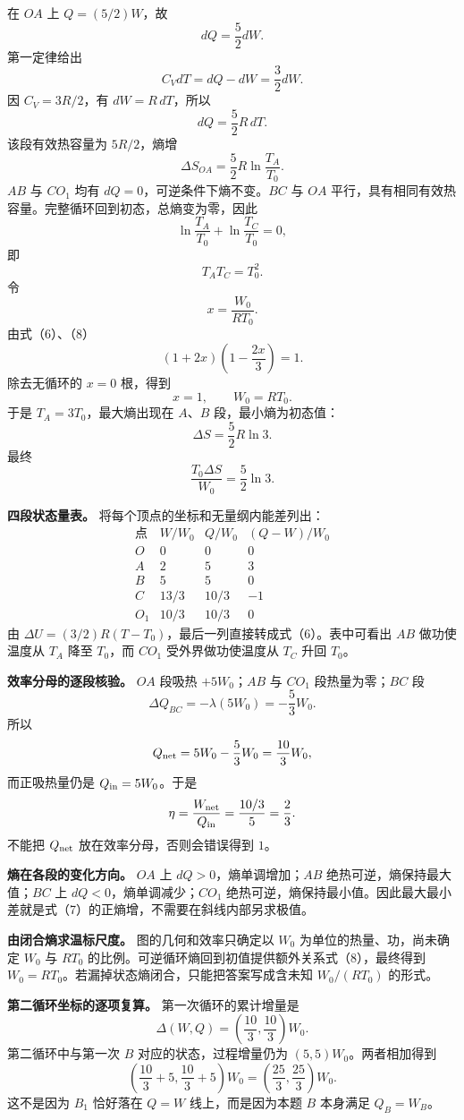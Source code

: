 \documentclass[12pt,a4paper,UTF8]{ctexart}
\begin{document}
在 \(OA\) 上 \(Q=(5/2)W\)，故 \[
dQ=\frac52dW.
\] 第一定律给出 \[
C_VdT=dQ-dW=\frac32dW.
\] 因 \(C_V=3R/2\)，有 \(dW=R\,dT\)，所以 \[
dQ=\frac52R\,dT.
\] 该段有效热容量为 \(5R/2\)，熵增 \[
\Delta S_{OA}
=\frac52R\ln\frac{T_A}{T_0}. \tag{7}
\] \(AB\) 与 \(CO_1\) 均有 \(dQ=0\)，可逆条件下熵不变。\(BC\) 与 \(OA\)
平行，具有相同有效热容量。完整循环回到初态，总熵变为零，因此 \[
\ln\frac{T_A}{T_0}
+\ln\frac{T_C}{T_0}=0,
\] 即 \[
T_AT_C=T_0^2. \tag{8}
\] 令 \[
x=\frac{W_0}{RT_0}.
\] 由式（6）、（8） \[
(1+2x)\left(1-\frac{2x}{3}\right)=1.
\] 除去无循环的 \(x=0\) 根，得到 \[
x=1,\qquad W_0=RT_0. \tag{9}
\] 于是 \(T_A=3T_0\)，最大熵出现在 \(A\)、\(B\) 段，最小熵为初态值： \[
\Delta S=\frac52R\ln3.
\] 最终 \[
\boxed{
\frac{T_0\Delta S}{W_0}
=\frac52\ln3
}. \tag{10}
\]

\textbf{四段状态量表。} 将每个顶点的坐标和无量纲内能差列出： \[
\begin{array}{c|c|c|c}
\text{点}&W/W_0&Q/W_0&(Q-W)/W_0\\ \hline
O&0&0&0\\
A&2&5&3\\
B&5&5&0\\
C&13/3&10/3&-1\\
O_1&10/3&10/3&0
\end{array}
\] 由 \(\Delta U=(3/2)R(T-T_0)\)，最后一列直接转成式（6）。表中可看出
\(AB\) 做功使温度从 \(T_A\) 降至 \(T_0\)，而 \(CO_1\) 受外界做功使温度从
\(T_C\) 升回 \(T_0\)。

\textbf{效率分母的逐段核验。} \(OA\) 段吸热 \(+5W_0\)；\(AB\) 与
\(CO_1\) 段热量为零；\(BC\) 段 \[
\Delta Q_{BC}=-\lambda(5W_0)=-\frac53W_0.
\] 所以 \[
Q_{\rm net}=5W_0-\frac53W_0=\frac{10}{3}W_0,
\] 而正吸热量仍是 \(Q_{\rm in}=5W_0\)。于是 \[
\eta=\frac{W_{\rm net}}{Q_{\rm in}}
=\frac{10/3}{5}=\frac23.
\] 不能把 \(Q_{\rm net}\) 放在效率分母，否则会错误得到 \(1\)。

\textbf{熵在各段的变化方向。} \(OA\) 上 \(dQ>0\)，熵单调增加；\(AB\)
绝热可逆，熵保持最大值；\(BC\) 上 \(dQ<0\)，熵单调减少；\(CO_1\)
绝热可逆，熵保持最小值。因此最大最小差就是式（7）的正熵增，不需要在斜线内部另求极值。

\textbf{由闭合熵求温标尺度。} 图的几何和效率只确定以 \(W_0\)
为单位的热量、功，尚未确定 \(W_0\) 与 \(RT_0\)
的比例。可逆循环熵回到初值提供额外关系式（8），最终得到
\(W_0=RT_0\)。若漏掉状态熵闭合，只能把答案写成含未知 \(W_0/(RT_0)\)
的形式。

\textbf{第二循环坐标的逐项复算。} 第一次循环的累计增量是 \[
\Delta(W,Q)=\left(\frac{10}{3},\frac{10}{3}\right)W_0.
\] 第二循环中与第一次 \(B\) 对应的状态，过程增量仍为
\((5,5)W_0\)。两者相加得到 \[
\left(\frac{10}{3}+5,\frac{10}{3}+5\right)W_0
=\left(\frac{25}{3},\frac{25}{3}\right)W_0.
\] 这不是因为 \(B_1\) 恰好落在 \(Q=W\) 线上，而是因为本题 \(B\) 本身满足
\(Q_B=W_B\)。
\end{document}
